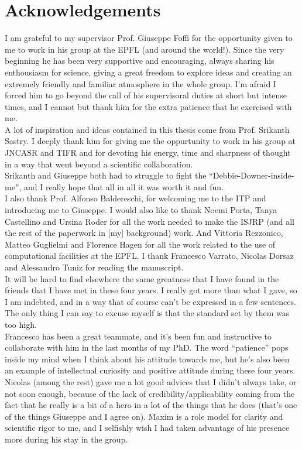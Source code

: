\chapter*{Acknowledgements}

I am grateful to my supervisor Prof. Giuseppe Foffi for the opportunity given to me to work in his group at the EPFL (and around the world!). Since the very beginning he has been very supportive and encouraging, always sharing his enthousiasm for science, giving a great freedom to explore ideas and creating an extremely friendly and familiar atmosphere in the whole group. I'm afraid I forced him to go beyond the call of his supervisoral duties at short but intense times, and I cannot but thank him for the extra patience that he exercised with me. \\
A lot of inspiration and ideas contained in this thesis come from Prof. Srikanth Sastry. I deeply thank him for giving me the oppurtunity to work in his group at JNCASR and TIFR and for devoting his energy, time and sharpness of thought in a way that went beyond a scientific collaboration. \\
Srikanth and Giuseppe both had to struggle to fight the ``Debbie-Downer-inside-me'', and I really hope that all in all it was worth it and fun.\\
I also thank Prof. Alfonso Baldereschi, for welcoming me to the ITP and introducing me to Giuseppe. I would also like to thank Noemi Porta, Tanya Castellino and Ursina Roder for all the work needed to make the ISJRP (and all the rest of the paperwork in [my] background) work. And Vittoria Rezzonico, Matteo Guglielmi and Florence Hagen for all the work related to the use of computational facilities at the EPFL. 
I thank Francesco Varrato, Nicolas Dorsaz and Alessandro Tuniz for reading the manuscript.\\
 
It will be hard to find elsewhere the same greatness that I have found in the  friends that I have met in these four years. I really got more than what I gave, so I am indebted, and in a way that of course can't be expressed in a few sentences. The only thing I can say to excuse myself is that the standard set by them was too high. \\
Francesco has been a great teammate, and it's been fun and instructive to collaborate with him in the last months of my PhD. The word ``patience'' pops inside my mind when I think about his attitude towards me, but he's also been an example of intellectual curiosity and positive attitude during these four years. Nicolas (among the rest) gave me a lot good advices that I didn't always take, or not soon enough, because of the lack of credibility/applicability coming from the fact that he really is a bit of a hero in a lot of the things that he does (that's one of the things Giuseppe and I agree on). Maxim is a role model for clarity and scientific rigor to me, and I selfishly wish I had taken advantage of his presence more during his stay in the group. 


